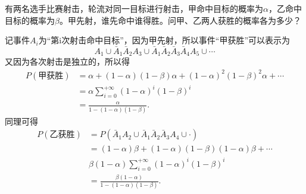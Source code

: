 \begin{example}
    有两名选手比赛射击，轮流对同一目标进行射击，甲命中目标的概率为$\alpha$，乙命中目标的概率为$\beta$。甲先射，谁先命中谁得胜。问甲、乙两人获胜的概率各为多少？
\end{example}
\begin{solution}
    记事件$A_i$为“第i次射击命中目标”，因为甲先射，所以事件“甲获胜”可以表示为
    \[ A_1 \cup \bar A_1\bar A_2 A_3 \cup \bar A_1\bar A_2\bar A_3\bar A_4A_5\cup\cdots \]
    又因为各次射击是独立的，所以得
    \begin{align*}
        P(\text{甲获胜}) & = \alpha + (1-\alpha)(1-\beta)\alpha + (1-\alpha)^2(1-\beta)^2\alpha + \cdots \\
                         & = \alpha\sum_{i=0}^{+\infty}(1-\alpha)^i(1-\beta)^i                           \\
                         & = \frac{\alpha}{1-(1-\alpha)(1-\beta)}.
    \end{align*}
    同理可得
    \begin{align*}
        P(\text{乙获胜}) & = P(\bar A_1A_2\cup \bar A_1\bar A_2\bar A_3A_4\cup\cdot)       \\
                         & = (1-\alpha)\beta + (1-\alpha)(1-\beta)(1-\alpha)\beta + \cdots \\
                         & \beta (1-\alpha)\sum_{i=0}^{+\infty}(1-\alpha)^i(1-\beta)^i     \\
                         & = \frac{\beta(1-\alpha)}{1-(1-\alpha)(1-\beta)}.
    \end{align*}
\end{solution}


